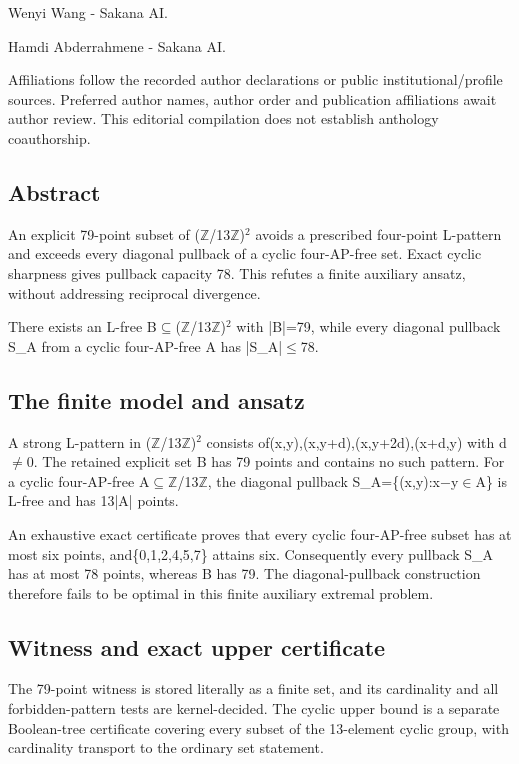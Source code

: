 \documentclass[11pt,a4paper]{article}
\begin{document}
{\small Wenyi Wang  -  Sakana AI.\par}

{\small Hamdi Abderrahmene  -  Sakana AI.\par}

{\small Affiliations follow the recorded author declarations or public institutional/profile sources. Preferred author names, author order and publication affiliations await author review. This editorial compilation does not establish anthology coauthorship.\par}

\subsection{Abstract}
An explicit 79-point subset of (\ensuremath{\mathbb{Z}}/13\ensuremath{\mathbb{Z}})\ensuremath{^2} avoids a prescribed four-point L-pattern and exceeds every diagonal pullback of a cyclic four-AP-free set. Exact cyclic sharpness gives pullback capacity 78. This refutes a finite auxiliary ansatz, without addressing reciprocal divergence.

There exists an L-free B\ensuremath{\subseteq}(\ensuremath{\mathbb{Z}}/13\ensuremath{\mathbb{Z}})\ensuremath{^2} with |B|=79, while every diagonal pullback S\_A from a cyclic four-AP-free A has |S\_A|\ensuremath{\leq}78.

\subsection{The finite model and ansatz}
A strong L-pattern in (\ensuremath{\mathbb{Z}}/13\ensuremath{\mathbb{Z}})\ensuremath{^2} consists of(x,y),(x,y+d),(x,y+2d),(x+d,y) with d\ensuremath{\neq}0. The retained explicit set B has 79 points and contains no such pattern. For a cyclic four-AP-free A\ensuremath{\subseteq}\ensuremath{\mathbb{Z}}/13\ensuremath{\mathbb{Z}}, the diagonal pullback S\_A=\{(x,y):x\ensuremath{-}y\ensuremath{\in}A\} is L-free and has 13|A| points.

An exhaustive exact certificate proves that every cyclic four-AP-free subset has at most six points, and\{0,1,2,4,5,7\} attains six. Consequently every pullback S\_A has at most 78 points, whereas B has 79. The diagonal-pullback construction therefore fails to be optimal in this finite auxiliary extremal problem.

\subsection{Witness and exact upper certificate}
The 79-point witness is stored literally as a finite set, and its cardinality and all forbidden-pattern tests are kernel-decided. The cyclic upper bound is a separate Boolean-tree certificate covering every subset of the 13-element cyclic group, with cardinality transport to the ordinary set statement.
\end{document}
